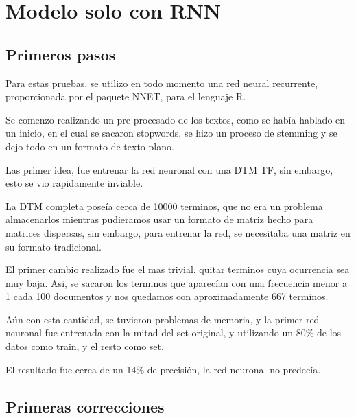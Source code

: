 
\chapter{Modelo solo con RNN} %

\label{RNN} %


\section{Primeros pasos}

Para estas pruebas, se utilizo en todo momento una red neural recurrente, proporcionada por el paquete NNET, para el lenguaje R.

Se comenzo realizando un pre procesado de los textos, como se había hablado en un inicio, en el cual se sacaron stopwords, se hizo un proceso de stemming y se dejo todo en un formato de texto plano.

Las primer idea, fue entrenar la red neuronal con una DTM TF, sin embargo, esto se vio rapidamente inviable.

La DTM completa poseía cerca de 10000 terminos, que no era un problema almacenarlos mientras pudieramos usar un formato de matriz hecho para matrices dispersas, sin embargo, para entrenar la red, se necesitaba una matriz en su formato tradicional.

El primer cambio realizado fue el mas trivial, quitar terminos cuya ocurrencia sea muy baja. Asi, se sacaron los terminos que aparecían con una frecuencia menor a 1 cada 100 documentos  y nos quedamos con aproximadamente 667 terminos.

Aún con esta cantidad, se tuvieron problemas de memoria, y la primer red neuronal fue entrenada con la mitad del set original, y utilizando un 80\% de los datos como train, y el resto como set.

El resultado fue cerca de un 14\% de precisión, la red neuronal no predecía.

\section{Primeras correcciones}

